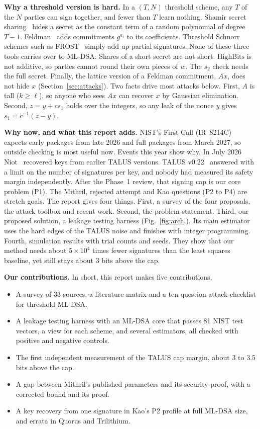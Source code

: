 \documentclass[10pt,conference,a4paper]{IEEEtran}
\newcommand{\HB}{\mathrm{HighBits}}
\begin{document}
\textbf{Why a threshold version is hard.} In a $(T,N)$ threshold scheme, any $T$ of the $N$ parties can sign together,
and fewer than $T$ learn nothing. Shamir secret sharing~\cite{shamir} hides a secret as the constant term of a random
polynomial of degree $T-1$. Feldman~\cite{feldman} adds commitments $g^{a_i}$ to its coefficients. Threshold Schnorr
schemes such as FROST~\cite{frost} simply add up partial signatures. None of these three tools carries over to ML-DSA. Shares
of a short secret are not short. $\HB$ is not additive, so parties cannot round their own pieces of $w$. The $s_2$ check
needs the full secret. Finally, the lattice version of a Feldman commitment, $Ax$, does not hide $x$
(Section~\ref{sec:attacks}). Two facts drive most attacks below. First, $A$ is tall ($k\ge\ell$), so anyone who sees $Ax$
can recover $x$ by Gaussian elimination. Second, $z=y+cs_1$ holds over the integers, so any leak of the nonce $y$ gives
$s_1=c^{-1}(z-y)$.

\textbf{Why now, and what this report adds.} NIST's First Call (IR~8214C)~\cite{ir8214c} expects early packages from late
2026 and full packages from March 2027, so outside checking is most useful now. Events this year show why. In July
2026 Niot~\cite{niot} recovered keys from earlier TALUS versions. TALUS v0.22~\cite{taluspw} answered with a limit on the
number of signatures per key, and nobody had measured its safety margin independently. After the Phase~1 review, that
signing cap is our core problem (P1). The Mithril, rejected attempt and Kao questions (P2 to P4) are stretch goals. The
report gives four things. First, a survey of the four proposals, the attack toolbox and recent work. Second, the problem
statement. Third, our proposed solution, a leakage testing harness (Fig.~\ref{fig:arch}). Its main estimator uses the hard
edges of the TALUS noise and finishes with integer programming. Fourth, simulation results with trial counts and seeds. They
show that our method needs about $5\times10^4$ times fewer signatures than the least squares baseline, yet still stays
about 3 bits above the cap.

\textbf{Our contributions.} In short, this report makes five contributions.
\begin{itemize}
\item A survey of 33 sources, a literature matrix and a ten question attack checklist for threshold ML-DSA.
\item A leakage testing harness with an ML-DSA core that passes 81 NIST test vectors, a view for each scheme, and
several estimators, all checked with positive and negative controls.
\item The first independent measurement of the TALUS cap margin, about 3 to 3.5 bits above the cap.
\item A gap between Mithril's published parameters and its security proof, with a corrected bound and its proof.
\item A key recovery from one signature in Kao's P2 profile at full ML-DSA size, and errata in Quorus and Trilithium.
\end{itemize}
\end{document}
